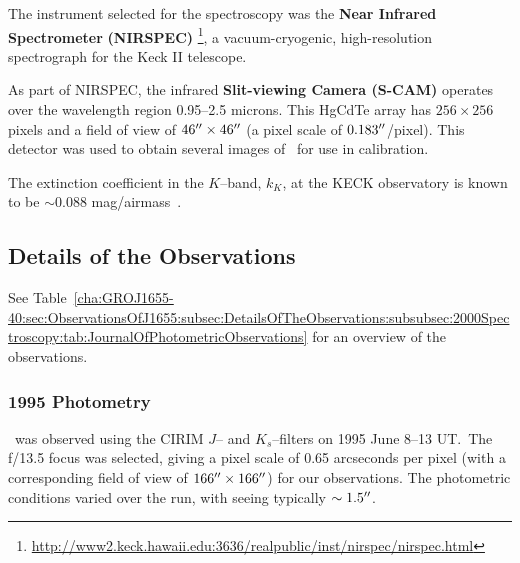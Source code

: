 The instrument selected for the spectroscopy was the \textbf{Near Infrared
Spectrometer} \textbf{(NIRSPEC)}%
\footnote{\label{cha:GROJ1655-40:sec:ObservationsOfJ1655:subsubsec:NIRSPEC:foot:NIRSPEC}
\url{http://www2.keck.hawaii.edu:3636/realpublic/inst/nirspec/nirspec.html}
}, %
a vacuum-cryogenic, high-resolution spectrograph for the Keck II
telescope. %

\vspace{\myparskip}

As part of NIRSPEC, the infrared \textbf{Slit-viewing Camera (S-CAM)}
operates over the wavelength region 0.95--2.5 microns. This HgCdTe
array has $256 \times 256$ pixels and a field of view of $46\hbox{$^{\prime\prime}$}
\times 46\hbox{$^{\prime\prime}$}$ (a pixel scale of $0.183\hbox{$^{\prime\prime}$}$/pixel). This
detector was used to obtain several images of \groj\ for use in
calibration. %

\vspace{\myparskip}

The extinction coefficient in the $K$--band, $k_K$, at the KECK observatory is
known to be $\sim 0.088$ mag/airmass~\cite{Curran:2001}. %


\subsection{Details of the Observations}\label{cha:GROJ1655-40:sec:ObservationsOfJ1655:subsec:DetailsOfTheObservations}

See Table~\vref{cha:GROJ1655-40:sec:ObservationsOfJ1655:subsec:DetailsOfTheObservations:subsubsec:2000Spectroscopy:tab:JournalOfPhotometricObservations} for an overview of the observations. %

\subsubsection{1995 Photometry}\label{cha:GROJ1655-40:sec:ObservationsOfJ1655:subsec:DetailsOfTheObservations:subsubsec:1995Photometry}

\groj\ was observed using the CIRIM $J$-- and $K_s$--filters on 1995
June 8--13 UT.\@\ The f/13.5 focus was selected, giving a pixel scale of 0.65
arcseconds per pixel (with a corresponding field of view of
$166\hbox{$^{\prime\prime}$}\times166\hbox{$^{\prime\prime}$}$) for our observations. The photometric
conditions varied over the run, with seeing typically
$\sim1.5\hbox{$^{\prime\prime}$}$. %

\vspace{\myparskip}

